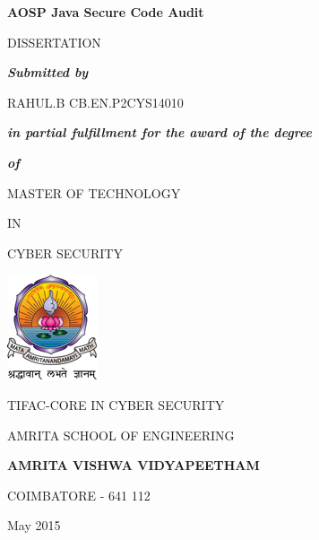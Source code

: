 \begin{center}
\Large
\textbf{AOSP Java Secure Code Audit}

\vspace*{32pt}
\normalsize
DISSERTATION

\vspace*{32pt}
\textbf{\textit{Submitted by}}

\vspace*{32pt}
\begin{flushleft}
 \hspace*{115pt}
 \large                             
RAHUL.B
 \hspace*{2pt}
 \large
CB.EN.P2CYS14010
\end{flushleft}

\vspace*{32pt}
\normalsize
\textit{\textbf{in partial fulfillment for the award of the degree}}

\textbf{\textit{of}}

\vspace*{32pt}
MASTER OF TECHNOLOGY

IN

CYBER SECURITY

\vspace*{32pt}
\includegraphics[keepaspectratio=true]{WSU/avvp_logo.png}

\vspace*{20pt}
\normalsize
TIFAC-CORE IN CYBER SECURITY

\vspace*{5pt}
AMRITA SCHOOL OF ENGINEERING

\vspace*{5pt}
\large
\textbf{AMRITA VISHWA VIDYAPEETHAM}

\vspace*{5pt}
\normalsize
COIMBATORE - 641 112

\vspace*{10pt}
May 2015
\end{center}
 


\clearpage




